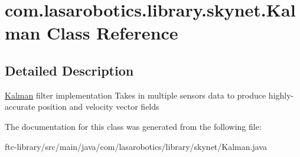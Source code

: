 \hypertarget{classcom_1_1lasarobotics_1_1library_1_1skynet_1_1_kalman}{}\section{com.\+lasarobotics.\+library.\+skynet.\+Kalman Class Reference}
\label{classcom_1_1lasarobotics_1_1library_1_1skynet_1_1_kalman}


\subsection{Detailed Description}
\hyperlink{classcom_1_1lasarobotics_1_1library_1_1skynet_1_1_kalman}{Kalman} filter implementation Takes in multiple sensors\textquotesingle{} data to produce highly-\/accurate position and velocity vector fields 

The documentation for this class was generated from the following file\+:\begin{DoxyCompactItemize}
\item 
ftc-\/library/src/main/java/com/lasarobotics/library/skynet/Kalman.\+java\end{DoxyCompactItemize}
